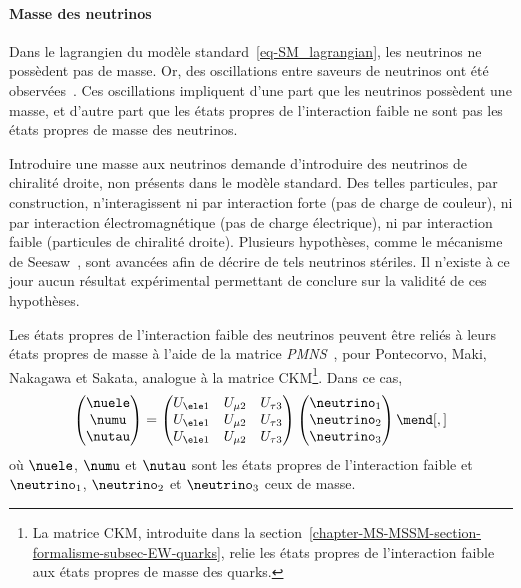 \paragraph{Masse des neutrinos}
Dans le lagrangien du modèle standard~\eqref{eq-SM_lagrangian}, les neutrinos ne possèdent pas de masse.
Or, des oscillations entre saveurs de neutrinos ont été observées~\cite{neutrino_oscillations_1,neutrino_oscillations_2}.
Ces oscillations impliquent d'une part que les neutrinos possèdent une masse, et d'autre part que les états propres de l'interaction faible ne sont pas les états propres de masse des neutrinos.
\par Introduire une masse aux neutrinos demande d'introduire des neutrinos de chiralité droite, non présents dans le modèle standard.
Des telles particules, par construction, n'interagissent ni par interaction forte (pas de charge de couleur), ni par interaction électromagnétique (pas de charge électrique), ni par interaction faible (particules de chiralité droite).
Plusieurs hypothèses, comme le mécanisme de Seesaw~\cite{neutrino_masses_1,neutrino_masses_2,neutrino_masses_3,neutrino_masses_4,neutrino_masses_5}, sont avancées afin de décrire de tels neutrinos stériles.
Il n'existe à ce jour aucun résultat expérimental permettant de conclure sur la validité de ces hypothèses.
\par Les états propres de l'interaction faible des neutrinos peuvent être reliés à leurs états propres de masse à l'aide de la matrice \emph{PMNS}~\cite{PMNS_MNS}, pour Pontecorvo, Maki, Nakagawa et Sakata, analogue à la matrice CKM\footnote{La matrice CKM, introduite dans la section~\ref{chapter-MS-MSSM-section-formalisme-subsec-EW-quarks}, relie les états propres de l'interaction faible aux états propres de masse des quarks.}.
Dans ce cas,
\begin{equation}
\begin{pmatrix}
\nuele \\ \numu \\ \nutau
\end{pmatrix}
=
\begin{pmatrix}
U_{\ele 1} & U_{\mu 2} & U_{\tau 3} \\
U_{\ele 1} & U_{\mu 2} & U_{\tau 3} \\
U_{\ele 1} & U_{\mu 2} & U_{\tau 3} \\
\end{pmatrix}
\begin{pmatrix}
\neutrino_1 \\ \neutrino_2 \\ \neutrino_3
\end{pmatrix}
\mend[,]
\end{equation}
où $\nuele$, $\numu$ et $\nutau$ sont les états propres de l'interaction faible et $\neutrino_1$, $\neutrino_2$ et $\neutrino_3$ ceux de masse.
